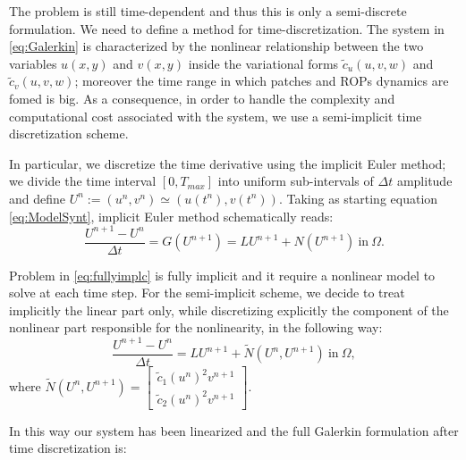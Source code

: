 The problem is still time-dependent and thus this is only a semi-discrete formulation. We need to define a method for time-discretization. The system in \eqref{eq:Galerkin} is characterized by the nonlinear relationship between the two variables $u(x,y)$ and $v(x,y)$ inside the variational forms $\tilde{c}_u(u, v, w) $ and $\tilde{c}_v(u, v, w) $; moreover the time range in which patches and ROPs dynamics are fomed  is big. As a consequence, in order to handle the complexity and computational cost associated with the system, we use a semi-implicit time discretization scheme.

In particular, we discretize the time derivative using the implicit Euler method; we divide the time interval $\left[ 0, T_{max}\right]$ into uniform sub-intervals of $\Delta t$ amplitude and define $U^n := (u^n, v^n) \simeq \left(u(t^n), v(t^n)\right)$. Taking as starting equation \eqref{eq:ModelSynt}, implicit Euler method schematically reads:
\begin{equation}\label{eq:fullyimplc}
    \frac{U^{n+1}-U^{n}}{\Delta t} = G(U^{n+1}) = L U^{n+1} + N(U^{n+1}) \ \text{in} \ \Omega.
\end{equation}

Problem in \eqref{eq:fullyimplc} is fully implicit and it require a nonlinear model to solve at each time step. For the semi-implicit scheme, we decide to treat implicitly the linear part only, while discretizing explicitly the component of the nonlinear part responsible for the nonlinearity, in the following way:
\begin{equation}
    \frac{U^{n+1}-U^{n}}{\Delta t} = L U^{n+1} + \tilde{N}(U^n, U^{n+1}) \ \text{in} \ \Omega,
\end{equation}
where $\tilde{N}(U^n, U^{n+1}) = \begin{bmatrix} \tilde{c}_1 \left(u^n\right)^2 v^{n+1} \\ \tilde{c}_2 \left(u^n\right)^2 v^{n+1} \end{bmatrix}$.

In this way our system has been linearized and the full Galerkin formulation after time discretization is:

